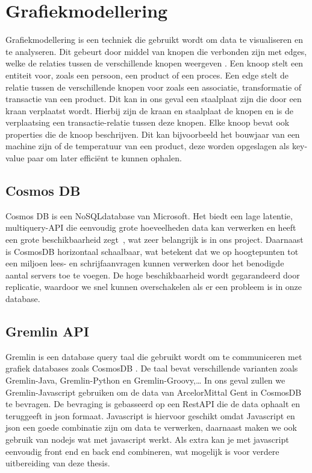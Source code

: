 \label{sec:grafiekmodellering}
\section{Grafiekmodellering}
Grafiekmodellering is een techniek die gebruikt wordt om data te visualiseren en te analyseren. Dit gebeurt door middel van knopen die verbonden zijn met edges, welke de relaties tussen de verschillende knopen weergeven \autocite{neo4j2025}.
Een knoop stelt een entiteit voor, zoals een persoon, een product of een proces. Een edge stelt de relatie tussen de verschillende knopen voor zoals een associatie, transformatie of transactie van een product.
Dit kan in ons geval een staalplaat zijn die door een kraan verplaatst wordt. Hierbij zijn de kraan en staalplaat de knopen en is de verplaatsing een transactie-relatie tussen deze knopen.
Elke knoop bevat ook properties die de knoop beschrijven. Dit kan bijvoorbeeld het bouwjaar van een machine zijn of de temperatuur van een product, deze worden opgeslagen als key-value paar om later efficiënt te kunnen ophalen.

\subsection{Cosmos DB}%
Cosmos DB is een NoSQL\-database van Microsoft. Het biedt een lage latentie, multi\-query-API die eenvoudig grote hoeveelheden data kan verwerken en heeft een grote beschikbaarheid zegt~\textcite{Put2020}, wat zeer belangrijk is in ons project.
Daarnaast is CosmosDB horizontaal schaalbaar, wat betekent dat we op hoogtepunten tot een miljoen lees- en schrijfaanvragen kunnen verwerken door het benodigde aantal servers toe te voegen.
De hoge beschikbaarheid wordt gegarandeerd door replicatie, waardoor we snel kunnen overschakelen als er een probleem is in onze database.

\subsection{Gremlin API}
Gremlin is een database query taal die gebruikt wordt om te communiceren met grafiek databases zoals CosmosDB \autocite{Tinkerpop2023}.\@
De taal bevat verschillende varianten zoals Gremlin-Java, Gremlin-Python en Gremlin-Groovy,\dots
In ons geval zullen we Gremlin-Javascript gebruiken om de data van ArcelorMittal Gent in CosmosDB te bevragen. De bevraging is gebasseerd op een RestAPI die de data ophaalt en teruggeeft in json formaat.
Javascript is hiervoor geschikt omdat Javascript en json een goede combinatie zijn om data te verwerken, daarnaast maken we ook gebruik van nodejs wat met javascript werkt. 
Als extra kan je met javascript eenvoudig front end en back end combineren, wat mogelijk is voor verdere uitbereiding van deze thesis.

